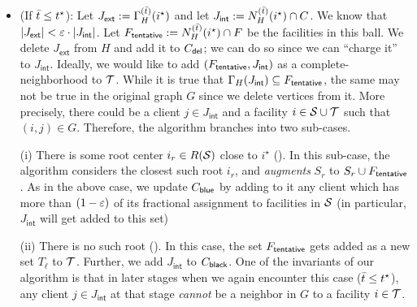 \begin{itemize}
\item (If $\bar{t} \leq t^\star$): Let $J_\mathsf{ext} := \Gamma_H^{(\bar{t})}(i^\star)$ and let $J_\mathsf{int} := N_H^{(\bar{t})}(i^\star) \cap C$. We know that $|J_\mathsf{ext}| < \varepsilon\cdot |J_\mathsf{int}|$.
Let $F_\mathsf{tentative} := N_H^{(\bar{t})}(i^\star) \cap F$ be the facilities in this ball. We delete $J_\mathsf{ext}$ from $H$ and add it to $C_{\mathsf{del}}$; we can do so since we can ``charge it'' to $J_\mathsf{int}$.
Ideally, we would like to add $(F_\mathsf{tentative},J_\mathsf{int})$ as a complete-neighborhood to ${\cal T}$.
While it is true that $\Gamma_H(J_\mathsf{int}) \subseteq F_\mathsf{tentative}$, the same may not be true in the original graph $G$ since we delete vertices from it. More precisely, there could be a client $j\in J_\mathsf{int}$ and a facility $i\in {\cal S}\cup{\cal T}$
such that $(i,j) \in G$. Therefore, the algorithm branches into two sub-cases.
%
%

(i) There is some root center  $i_r \in R({\cal S})$ close to $i^\star$ (). In  this
    sub-case, the algorithm considers the closest such root $i_r$, and {\em augments} $S_r$ to $S_r \cup F_\mathsf{tentative}$. As in the above case,
    we update $C_{\mathsf{blue}}$ by adding to it any client which has more than $(1-\varepsilon)$ of its fractional assignment to facilities in ${\cal S}$ (in particular, $J_\mathsf{int}$ will
    get added to this set)

 (ii) There is no such root ().  In this case, the set $F_\mathsf{tentative}$ gets added as a new set $T_\ell$ to ${\cal T}$. Further,
    we add $J_\mathsf{int}$ to $C_{\mathsf{black}}$. One of the invariants of our algorithm is that in later stages when we again encounter this case ($\bar{t} \leq t^\star$), any client $j\in J_\mathsf{int}$ at that stage {\em cannot} be a neighbor in $G$ to a facility $i\in {\cal T}$.
    \end{itemize}

